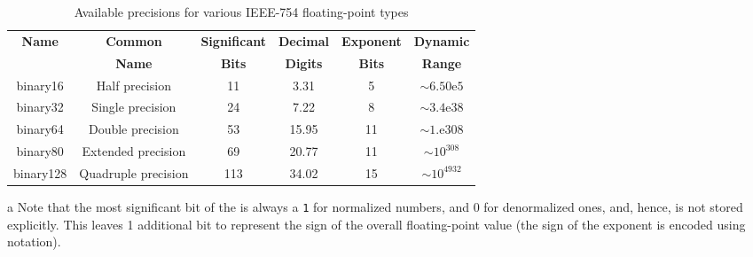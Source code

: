 \begin{table}[h!] 
\begin{center}
\begin{threeparttable}
\caption{Available precisions for various IEEE-754 floating-point types}\label{digitseparator-table3}\vspace{1.5ex} 
{\small \begin{tabular}{c|c|c|c|c|c}\thickhline 
\rowcolor[gray]{.9}   {\sffamily\bfseries Name} & {\sffamily\bfseries Common} &
{\sffamily\bfseries Significant } & {\sffamily\bfseries Decimal }& {\sffamily\bfseries Exponent } & {\sffamily\bfseries Dynamic}\\
\rowcolor[gray]{.9}    & {\sffamily\bfseries Name} &
{\sffamily\bfseries Bits\tnote{a}} & {\sffamily\bfseries Digits}& {\sffamily\bfseries Bits} & {\sffamily\bfseries Range}\\ \hline 
binary16 & Half precision & 11 & 3.31 & 5 & $\sim6.50\text{e}5$\\ \hline
binary32 & Single precision & 24 & 7.22 & 8 & $\sim3.4\text{e}38$\\ \hline
binary64 & Double precision & 53 & 15.95 & 11 & $\sim1.\text{e}308$\\ \hline
\rule{0pt}{3.5mm}binary80 & Extended precision & 69 & 20.77 & 11 & $\sim10^{308}$\\ \hline
\rule{0pt}{3.5mm}binary128 & Quadruple precision & 113 & 34.02 & 15 & $\sim10^{4932}$\\ \hline
\end{tabular}
} %
\begin{tablenotes}{\footnotesize  
\item[a]{Note that the most significant bit of the 
is always a \lstinline!1! for normalized numbers, and 0 for denormalized ones, and,  hence, is not stored explicitly. This leaves 1
additional bit to represent the sign of the overall floating-point value
(the sign of the exponent is encoded using 
notation).} 
} %
\end{tablenotes} %
\end{threeparttable} 
\end{center}
\end{table}

